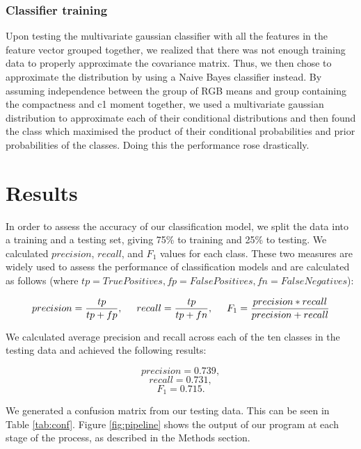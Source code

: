 \documentclass[12pt]{article}
\begin{document}
\subsubsection{Classifier training}

Upon testing the multivariate gaussian classifier with all the features in the feature vector grouped together, we realized that there was not enough training data to properly approximate the covariance matrix. Thus, we then chose to approximate the distribution by using a Naive Bayes classifier instead. By assuming independence between the group of RGB means and group containing the compactness and c1 moment together, we used a multivariate gaussian distribution to approximate each of their conditional distributions and then found the class which maximised the product of their conditional probabilities and prior probabilities of the classes. Doing this the performance rose drastically.

\section{Results}

In order to assess the accuracy of our classification model, we split the data into a training and a testing set, giving 75\% to training and 25\% to testing. We calculated $precision$, $recall$, and $F_1$ values for each class. These two measures are widely used to assess the performance of classification models and are calculated as follows (where $tp=TruePositives,fp=FalsePositives,fn=FalseNegatives$):

\[precision=\frac{tp}{tp+fp},\hspace{5mm}recall=\frac{tp}{tp+fn},\hspace{5mm}F_1=\frac{precision*recall}{precision+recall}\]

We calculated average precision and recall across each of the ten classes in the testing data and achieved the following results: 

\[precision=0.739,\]
\[recall=0.731,\]
\[F_1=0.715.\]

We generated a confusion matrix from our testing data. This can be seen in Table \ref{tab:conf}. Figure \ref{fig:pipeline} shows the output of our program at each stage of the process, as described in the Methods section.
\end{document}
